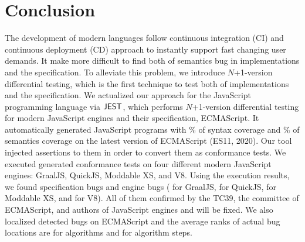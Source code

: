 \section{Conclusion}\label{sec:conclude}
The development of modern languages follow continuous integration (CI) and
continuous deployment (CD) approach to instantly support fast changing user
demands.  It make more difficult to find both of semantics bug in implementations
and the specification.  To alleviate this problem, we introduce
$N$+1-version differential testing, which is the first technique to test both of
implementations and the specification.  We actualized our approach for the
JavaScript programming language via $\text{\sf JEST}$, which performs $N$+1-version differential
testing for modern JavaScript engines and their specification, ECMAScript.  It
automatically generated \inred{-} JavaScript programs with \inred{-}\% of syntax
coverage and \inred{-}\% of semantics coverage on the latest version of
ECMAScript (ES11, 2020).  Our tool injected assertions to them in order to
convert them as conformance tests.  We executed generated conformance tests on
four different modern JavaScript engines: GraalJS, QuickJS, Moddable XS, and V8.
Using the execution results, we found \inred{-} specification bugs and
\inred{-} engine bugs (\inred{-} for GraalJS, \inred{-} for QuickJS, \inred{-}
for Moddable XS, and \inred{-} for V8). All of them confirmed by the TC39, the
committee of ECMAScript, and authors of JavaScript engines and will be fixed.
We also localized detected bugs on ECMAScript and the average ranks of actual
bug locations are \inred{-} for algorithms and \inred{-} for algorithm steps.
